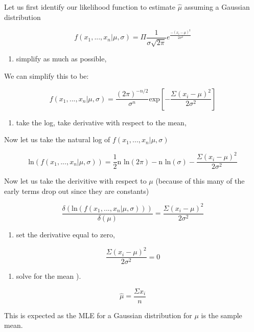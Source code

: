 \documentclass[]{article}
\providecommand{\tightlist}{%
  \setlength{\itemsep}{0pt}\setlength{\parskip}{0pt}}
\begin{document}
Let us first identify our likelihood function to estimate \(\hat{\mu}\)
assuming a Gaussian distribution

\[ f(x_1 , ...,x_n|\mu , \sigma) = \Pi \frac{1}{\sigma \sqrt{2\pi}} e^{\frac{-(x_i -\mu)^2}{2\sigma^2}} \]

\begin{enumerate}
\def\labelenumi{\arabic{enumi}.}
\setcounter{enumi}{1}
\tightlist
\item
  simplify as much as possible,
\end{enumerate}

We can simplify this to be:

\[ f(x_1 , ...,x_n|\mu , \sigma) = \frac{(2\pi)^{-n/2}}{\sigma^n} \text{exp} [-\frac{\Sigma(x_i-\mu)^2}{2\sigma^2}]  \]

\begin{enumerate}
\def\labelenumi{\arabic{enumi}.}
\setcounter{enumi}{2}
\tightlist
\item
  take the log, take derivative with respect to the mean,
\end{enumerate}

Now let us take the natural log of \(f(x_1 , ...,x_n|\mu , \sigma)\)

\[ \text{ln}(f(x_1 , ...,x_n|\mu , \sigma)) = \frac{1}{2}\text{n ln}(2\pi)-\text{n ln}(\sigma)-\frac{\Sigma(x_i-\mu)^2}{2\sigma^2}\]

Now let us take the derivitive with respect to \(\mu\) (because of this
many of the early terms drop out since they are constants)

\[ \frac{\delta(\text{ln}(f(x_1 , ...,x_n|\mu , \sigma)))}{\delta(\mu)} = \frac{\Sigma(x_i-\mu)^2}{2\sigma^2}  \]

\begin{enumerate}
\def\labelenumi{\arabic{enumi}.}
\setcounter{enumi}{3}
\tightlist
\item
  set the derivative equal to zero,
\end{enumerate}

\[ \frac{\Sigma(x_i-\mu)^2}{2\sigma^2} = 0  \]

\begin{enumerate}
\def\labelenumi{\arabic{enumi}.}
\setcounter{enumi}{4}
\tightlist
\item
  solve for the mean ).
\end{enumerate}

\[ \hat{\mu} = \frac{\Sigma x_i}{n}\]

This is expected as the MLE for a Gaussian distribution for \(\mu\) is
the sample mean.
\end{document}
